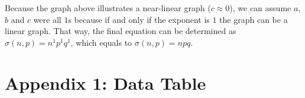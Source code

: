 \documentclass{article}
\begin{document}
Because the graph above illustrates a near-linear graph
(\(c \approx 0\)), we can assume \(a\), \(b\) and \(c\) were all \(1\)s
because if and only if the exponent is \(1\) the graph can be a linear
graph. That way, the final equation can be determined as
\(\sigma(n, p) = n^1p^1q^1\), which equals to \(\sigma(n, p) = npq\).

\newpage

    \section{Appendix 1: Data Table}\label{appendix-1-data-table}

    \begin{Verbatim}[commandchars=\\\{\}]

\end{Verbatim}
\end{document}
